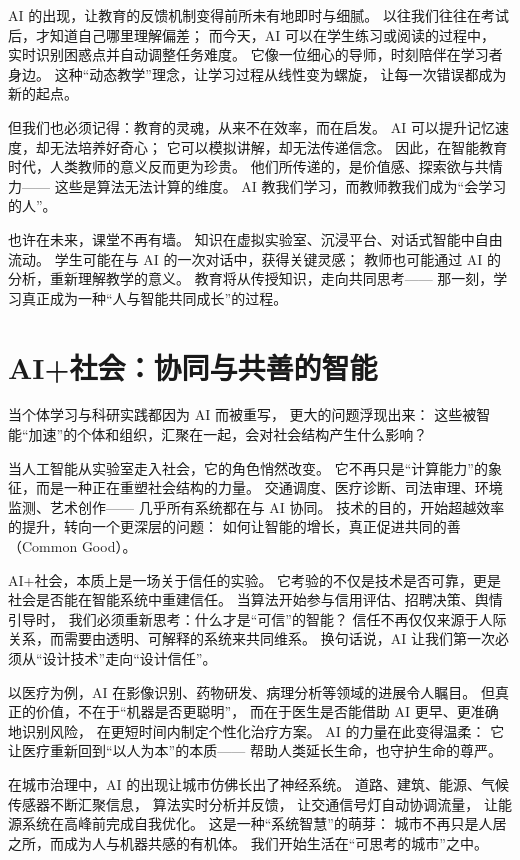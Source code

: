 AI 的出现，让教育的反馈机制变得前所未有地即时与细腻。  
以往我们往往在考试后，才知道自己哪里理解偏差；  
而今天，AI 可以在学生练习或阅读的过程中，  
实时识别困惑点并自动调整任务难度。  
它像一位细心的导师，时刻陪伴在学习者身边。  
这种“动态教学”理念，让学习过程从线性变为螺旋，  
让每一次错误都成为新的起点。

但我们也必须记得：教育的灵魂，从来不在效率，而在启发。  
AI 可以提升记忆速度，却无法培养好奇心；  
它可以模拟讲解，却无法传递信念。  
因此，在智能教育时代，人类教师的意义反而更为珍贵。  
他们所传递的，是价值感、探索欲与共情力——  
这些是算法无法计算的维度。  
AI 教我们学习，而教师教我们成为“会学习的人”。

也许在未来，课堂不再有墙。  
知识在虚拟实验室、沉浸平台、对话式智能中自由流动。  
学生可能在与 AI 的一次对话中，获得关键灵感；  
教师也可能通过 AI 的分析，重新理解教学的意义。  
教育将从传授知识，走向共同思考——  
那一刻，学习真正成为一种“人与智能共同成长”的过程。

\section{AI+社会：协同与共善的智能}

当个体学习与科研实践都因为 AI 而被重写，  
更大的问题浮现出来：  
这些被智能“加速”的个体和组织，汇聚在一起，会对社会结构产生什么影响？

当人工智能从实验室走入社会，它的角色悄然改变。  
它不再只是“计算能力”的象征，而是一种正在重塑社会结构的力量。  
交通调度、医疗诊断、司法审理、环境监测、艺术创作——  
几乎所有系统都在与 AI 协同。  
技术的目的，开始超越效率的提升，转向一个更深层的问题：  
如何让智能的增长，真正促进共同的善（Common Good）。

AI+社会，本质上是一场关于信任的实验。  
它考验的不仅是技术是否可靠，更是社会是否能在智能系统中重建信任。  
当算法开始参与信用评估、招聘决策、舆情引导时，  
我们必须重新思考：什么才是“可信”的智能？  
信任不再仅仅来源于人际关系，而需要由透明、可解释的系统来共同维系。  
换句话说，AI 让我们第一次必须从“设计技术”走向“设计信任”。

以医疗为例，AI 在影像识别、药物研发、病理分析等领域的进展令人瞩目。  
但真正的价值，不在于“机器是否更聪明”，  
而在于医生是否能借助 AI 更早、更准确地识别风险，  
在更短时间内制定个性化治疗方案。  
AI 的力量在此变得温柔：  
它让医疗重新回到“以人为本”的本质——  
帮助人类延长生命，也守护生命的尊严。

在城市治理中，AI 的出现让城市仿佛长出了神经系统。  
道路、建筑、能源、气候传感器不断汇聚信息，  
算法实时分析并反馈，  
让交通信号灯自动协调流量，  
让能源系统在高峰前完成自我优化。  
这是一种“系统智慧”的萌芽：  
城市不再只是人居之所，而成为人与机器共感的有机体。  
我们开始生活在“可思考的城市”之中。

